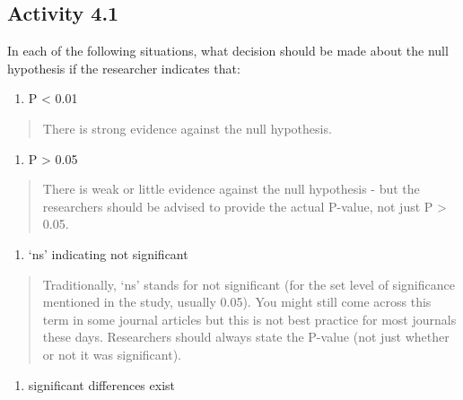 \documentclass[
]{memoir}
\providecommand{\tightlist}{%
  \setlength{\itemsep}{0pt}\setlength{\parskip}{0pt}}
\begin{document}
\hypertarget{activity-4.1}{%
\subsection*{Activity 4.1}\label{activity-4.1}}

In each of the following situations, what decision should be made about the null hypothesis if the researcher indicates that:

\begin{enumerate}
\def\labelenumi{\alph{enumi})}
\tightlist
\item
  P \textless{} 0.01
\end{enumerate}

\begin{quote}
There is strong evidence against the null hypothesis.
\end{quote}

\begin{enumerate}
\def\labelenumi{\alph{enumi})}
\setcounter{enumi}{1}
\tightlist
\item
  P \textgreater{} 0.05
\end{enumerate}

\begin{quote}
There is weak or little evidence against the null hypothesis - but the researchers should be advised to provide the actual P-value, not just P \textgreater{} 0.05.
\end{quote}

\begin{enumerate}
\def\labelenumi{\alph{enumi})}
\setcounter{enumi}{2}
\tightlist
\item
  `ns' indicating not significant
\end{enumerate}

\begin{quote}
Traditionally, `ns' stands for not significant (for the set level of significance mentioned in the study, usually 0.05). You might still come across this term in some journal articles but this is not best practice for most journals these days. Researchers should always state the P-value (not just whether or not it was significant).
\end{quote}

\begin{enumerate}
\def\labelenumi{\alph{enumi})}
\setcounter{enumi}{3}
\tightlist
\item
  significant differences exist
\end{enumerate}
\end{document}
